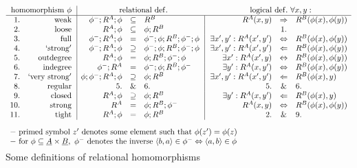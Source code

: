 \documentclass[10pt]{article}
\begin{document}
{\small{
\begin{table}[hbt]
\[\begin{array}{rr@{\ \ }|rcl@{\ \ }|@{\ \ }rcl}
\multicolumn{2}{r@{\ \ }|}{{\rm homomorphism}\ \phi} & \multicolumn{3}{c}{{\rm relational\ def.}} 
     & \multicolumn{3}{c}{{\rm logical\ def.}\ \forall x,y:} 
  \\ \hline
1.& {\rm weak} & \Comp{\phi^-}{\Comp {R^A}\phi} & \subseteq & R^B
            & R^A(x,y) & \Rightarrow & R^B(\phi(x),\phi(y)) \\
2. & {\rm loose} & \Comp{R^A}\phi & \subseteq & \Comp\phi{R^B} & & 1. & \\
3.& {\rm full} & \Comp{\phi^-}{\Comp {R^A}\phi} & = &
            \Comp{\Comp{\Comp{\phi^-}\phi}{R^B}}{\Comp{\phi^-}\phi}
           & \exists x',y':R^A(x',y') & \Iff & R^B(\phi(x),\phi(y)) \\
4.& {\rm `strong'} & \Comp{\phi^-}{\Comp {R^A}\phi} & \supseteq &
            \Comp{\Comp{\Comp{\phi^-}\phi}{R^B}}{\Comp{\phi^-}\phi} 
           & \exists x',y':R^A(x',y') & \Leftarrow & R^B(\phi(x),\phi(y)) \\
5.& {\rm outdegree} & \Comp{R^A}{\phi} &= &\Comp{\Comp{\phi}{R^B}}{\Comp{\phi^-}\phi}
           & \exists x':R^A(x',y) & \Iff & R^B(\phi(x),\phi(y)) \\
6.& {\rm indegree} & \Comp{\phi^-}{R^A} & = & \Comp{\Comp{\Comp{\phi^-}\phi}{R^B}}{\phi^-}
             & \exists y':R^A(x,y') & \Iff & R^B(\phi(x),\phi(y)) \\
7.& {\rm `very\ strong'} & \Comp{\Comp\phi{\phi^-}}{\Comp{R^A}{\phi}} & \supseteq &
            \Comp{\phi}{R^B} 
           & \exists x',y':R^A(x',y') & \Leftarrow & R^B(\phi(x),y) \\
8.& {\rm regular} & 5. & \& & 6. & 5. & \& & 6. \\
9.& {\rm closed} & \Comp{R^A}\phi&  \supseteq & \Comp\phi{R^B} 
           & \exists y':R^A(x,y') & \Leftarrow & R^B(\phi(x),y) \\
10.& {\rm strong} & R^A&  = & \Comp\phi{\Comp{R^B}{\phi^-}} 
           &  R^A(x,y) & \Iff & R^B(\phi(x),\phi(y)) \\
11.& {\rm tight} & \Comp{R^A}\phi & = & \Comp\phi{R^B} 
            & 2. & \& & 9. \\
\multicolumn{8}{c}{} \\[-.5ex]
\multicolumn{8}{l}{{\rm -\ primed\ symbol}\ z'\ {\rm denotes\ some\ element\ such\ that\ } \phi(z')=\phi(z)} \\
\multicolumn{8}{l}{{\rm -\ for}\ \phi\subseteq\under A\times\under B,\ \phi^-\ 
 {\rm denotes\ the\ inverse\ } \<b,a\>\in\phi^-\Iff \<a,b\>\in\phi} \vspace*{-2ex}
\end{array}
\]
\caption{Some definitions of relational homomorphisms} 
\label{de:relhomsde}
\end{table}
}\normalsize}
\end{document}

